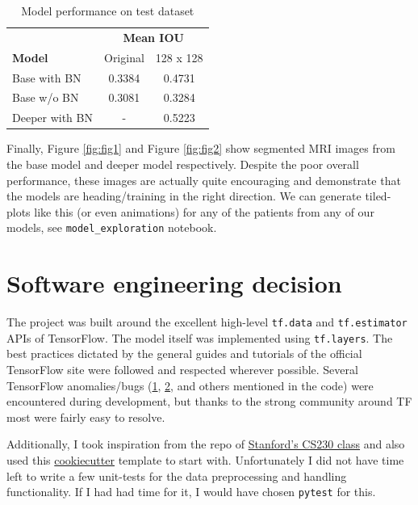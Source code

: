 \documentclass{article}
\begin{document}
\begin{table}[!ht]

	\centering
	\begin{tabular}{lcc}
		\toprule
		{} & \multicolumn{2}{c}{\textbf{Mean IOU}}  \\
		\cmidrule(r){2-3}
		\textbf{Model}     & Original     & 128 x 128 \\
		\midrule
		Base with BN    & 0.3384  & 0.4731  \\
		Base w/o BN     & 0.3081  & 0.3284  \\
		Deeper with BN  & -  & 0.5223  \\
		\bottomrule
	\end{tabular}
	\vspace{3mm}
	\caption{Model performance on test dataset}
	\label{tab:table1}
\end{table}

Finally, Figure \ref{fig:fig1} and Figure \ref{fig:fig2} show segmented MRI images from the base model and deeper model respectively. Despite the poor overall performance, these images are actually quite encouraging and demonstrate that the models are heading/training in the right direction. We can generate tiled-plots like this (or even animations) for any of the patients from any of our models, see \texttt{model\_exploration} notebook. 

\section{Software engineering decision}

The project was built around the excellent high-level \texttt{tf.data} and \texttt{tf.estimator} APIs of TensorFlow.  The model itself was implemented using \texttt{tf.layers}. The best practices dictated by the general guides and tutorials of the official TensorFlow site were followed and respected wherever possible. Several TensorFlow anomalies/bugs (\href{https://github.com/tensorflow/tensorflow/issues/20379}{1}, \href{https://github.com/tensorflow/tensorflow/issues/21748}{2}, and others mentioned in the code) were encountered during development, but thanks to the strong community around TF most were fairly easy to resolve. 

Additionally, I took inspiration from the repo of \href{https://github.com/cs230-stanford/cs230-code-examples/tree/master/tensorflow/vision}{Stanford's CS230 class} and also used this \href{https://drivendata.github.io/cookiecutter-data-science/}{cookiecutter} template to start with. Unfortunately I did not have time left to write a few unit-tests for the data preprocessing and handling functionality. If I had had time for it, I would have chosen \texttt{pytest} for this.
\end{document}
